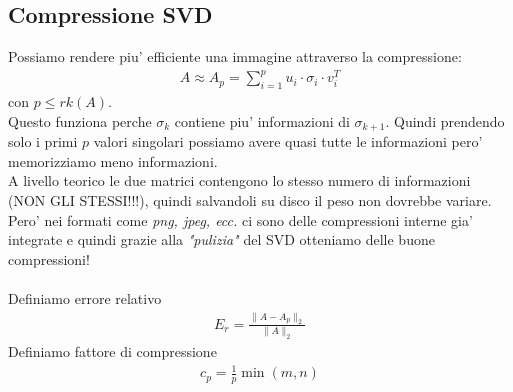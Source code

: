 \documentclass[a4paper,12pt]{article}
\begin{document}
\subsection{Compressione SVD}
Possiamo rendere piu' efficiente una immagine attraverso la compressione:
\begin{align*}
    A \approx A_p = \sum_{i=1}^p u_i \cdot \sigma_i \cdot v_i^T
\end{align*}
con $p \leq rk(A)$. \\
Questo funziona perche $\sigma_k$ contiene piu' informazioni di $\sigma_{k+1}$. Quindi prendendo solo i primi $p$ valori singolari possiamo avere quasi tutte le informazioni pero' memorizziamo meno informazioni. \\
A livello teorico le due matrici contengono lo stesso numero di informazioni (NON GLI STESSI!!!), quindi salvandoli su disco il peso non dovrebbe variare. Pero' nei formati come \textit{png, jpeg, ecc.} ci sono delle compressioni interne gia' integrate e quindi grazie alla \textit{"pulizia"} del SVD otteniamo delle buone compressioni! \\
\vspace{1em}\\
Definiamo errore relativo
\begin{align*}
    E_r = \frac{\| A - A_p \|_2}{\|A\|_2}
\end{align*}
Definiamo fattore di compressione
\begin{align*}
    c_p = \frac{1}{p} \min(m,n)
\end{align*}
\end{document}

